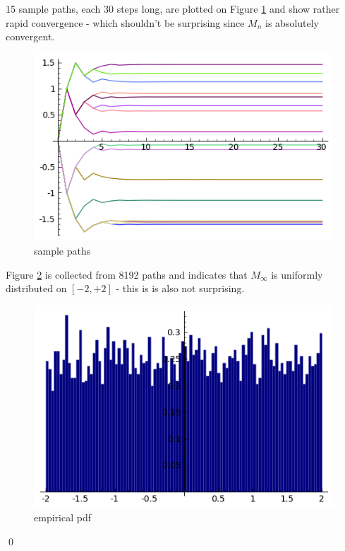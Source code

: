 \documentclass[aps,prl,twocolumn,floatfix,letterpaper]{revtex4}
\newenvironment{solution}[1][Solution]{\begin{trivlist}
    \item[\hskip \labelsep {\bfseries #1}]}{\end{trivlist}}
\begin{document}
\begin{solution}
15 sample paths, each 30 steps long, are plotted on Figure \ref{samplepaths} and show rather 
rapid convergence - which shouldn't be surprising since $M_n$ is absolutely convergent.
\begin{figure}
\includegraphics[height=.20\textheight]{hw5q4p1.png}
\caption[sample paths]
{sample paths}\label{samplepaths}
\end{figure}
Figure \ref{pdf} is collected from 8192 paths and indicates that $M_\infty$ is uniformly 
distributed on $[-2,+2]$ - this is is also not surprising.
\begin{figure}
\includegraphics[height=.20\textheight]{hw5q4p2.png}
\caption[pdf]
{empirical pdf}\label{pdf}
\end{figure}
\qed
\end{solution}

\appendix
%
%
\end{document}
